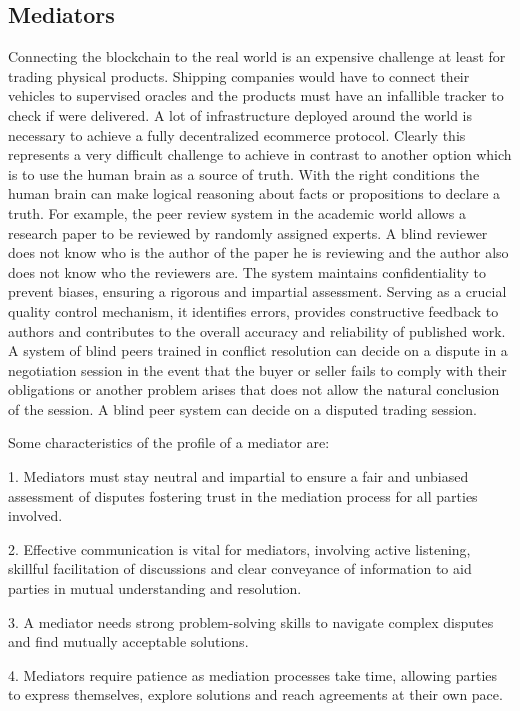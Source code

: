 \documentclass[12pt]{article}
\begin{document}
\subsection { Mediators }  

Connecting the blockchain to the real world is an expensive challenge at least for trading physical products.
Shipping companies would have to connect their vehicles to supervised oracles and the products must have an infallible tracker to check if were delivered.
A lot of infrastructure deployed around the world is necessary to achieve a fully decentralized ecommerce protocol.
Clearly this represents a very difficult challenge to achieve in contrast to another option which is to use the human brain as a source of truth.
With the right conditions the human brain can make logical reasoning about facts or propositions to declare a truth.
For example, the peer review system in the academic world allows a research paper to be reviewed by randomly assigned experts.
A blind reviewer does not know who is the author of the paper he is reviewing and the author also does not know who the reviewers are.
The system maintains confidentiality to prevent biases, ensuring a rigorous and impartial assessment. Serving as a crucial quality control mechanism, it identifies errors, provides constructive feedback to authors and contributes to the overall accuracy and reliability of published work. 
A system of blind peers trained in conflict resolution can decide on a dispute in a negotiation session in the event that the buyer or seller fails to comply with their obligations or another problem arises that does not allow the natural conclusion of the session.
A blind peer system can decide on a disputed trading session.

Some characteristics of the profile of a mediator are:

1. Mediators must stay neutral and impartial to ensure a fair and unbiased assessment of disputes fostering trust in the mediation process for all parties involved.

2. Effective communication is vital for mediators, involving active listening, skillful facilitation of discussions and clear conveyance of information to aid parties in mutual understanding and resolution.

3. A mediator needs strong problem-solving skills to navigate complex disputes and find mutually acceptable solutions. 

4. Mediators require patience as mediation processes take time, allowing parties to express themselves, explore solutions and reach agreements at their own pace.
\end{document}
